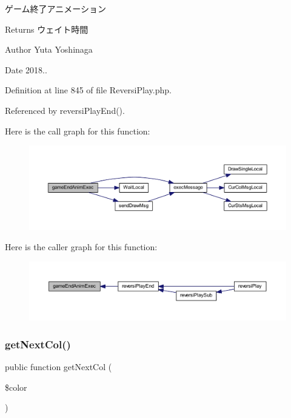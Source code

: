 ゲーム終了アニメーション 

\begin{DoxyReturn}{Returns}
ウェイト時間 
\end{DoxyReturn}
\begin{DoxyAuthor}{Author}
Yuta Yoshinaga 
\end{DoxyAuthor}
\begin{DoxyDate}{Date}
2018.. 
\end{DoxyDate}


Definition at line 845 of file Reversi\+Play.\+php.



Referenced by reversi\+Play\+End().

Here is the call graph for this function\+:\nopagebreak
\begin{figure}[H]
\begin{center}
\leavevmode
\includegraphics[width=350pt]{class_reversi_play_acbcd366da8242203ae52fb685fbc929e_cgraph}
\end{center}
\end{figure}
Here is the caller graph for this function\+:\nopagebreak
\begin{figure}[H]
\begin{center}
\leavevmode
\includegraphics[width=350pt]{class_reversi_play_acbcd366da8242203ae52fb685fbc929e_icgraph}
\end{center}
\end{figure}
\mbox{\label{class_reversi_play_a26fd2d7723695b69cbfde7e16b55b096}} 
\subsubsection{\texorpdfstring{get\+Next\+Col()}{getNextCol()}}
{\footnotesize\ttfamily public function get\+Next\+Col (\begin{DoxyParamCaption}\item[{}]{\$color }\end{DoxyParamCaption})}



